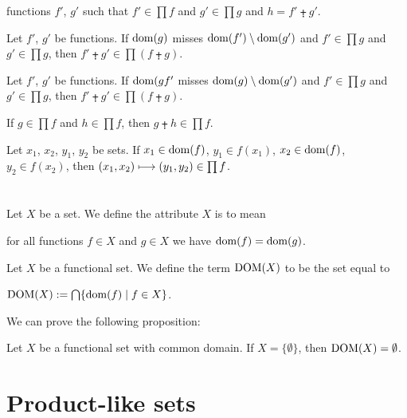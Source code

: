\documentclass{article}
\begin{document}
\begin{thm}
  functions $f'$, $g'$ such that $f'\in\prod f$ and $g'\in\prod g$ and
  $h=f'\plusdot g'$.
\item\label{card3:68} Let $f'$, $g'$ be functions.
  If $\operatorname{dom}(g)$ misses $\operatorname{dom}(f')\setminus\operatorname{dom}(g')$
  and $f'\in\prod g$ and $g'\in\prod g$,
  then $f'\plusdot g'\in\prod(f\plusdot g)$.
\item\label{card3:69} Let $f'$, $g'$ be functions.
  If $\operatorname{dom}(gf'$ misses $\operatorname{dom}(g)\setminus\operatorname{dom}(g')$
  and $f'\in\prod g$ and $g'\in\prod g$,
  then $f'\plusdot g'\in\prod(f\plusdot g)$.
\item\label{card3:70} If $g\in\prod f$ and $h\in\prod f$, then
  $g\plusdot h\in\prod f$.
\item\label{card3:71} Let $x_{1}$, $x_{2}$, $y_{1}$, $y_{2}$ be sets.
  If $x_{1}\in\operatorname{dom}(f)$, $y_{1}\in f(x_{1})$,
  $x_{2}\in\operatorname{dom}(f)$, $y_{2}\in f(x_{2})$,
  then $(x_{1},x_{2})\longmapsto(y_{1},y_{2})\in\prod f$.
\end{thm}

\section{}

\begin{definition}
Let $X$ be a set.
We define the attribute $X$ is  to mean
\begin{defn}
\item for all functions $f\in X$ and $g\in X$ we have $\operatorname{dom}(f)=\operatorname{dom}(g)$.
\end{defn}
\end{definition}

\begin{definition}
Let $X$ be a functional set.
We define the term $\operatorname{DOM}(X)$ to be the set equal to
\begin{defn}
\item $\operatorname{DOM}(X):=\bigcap\{\operatorname{dom}(f)\mid f\in X\}$.
\end{defn}
\end{definition}

We can prove the following proposition:
\begin{thm}
\item\label{card3:72} Let $X$ be a functional set with common domain.
  If $X=\{\emptyset\}$, then $\operatorname{DOM}(X)=\emptyset$.
\end{thm}

\section{Product-like sets}
\end{document}
